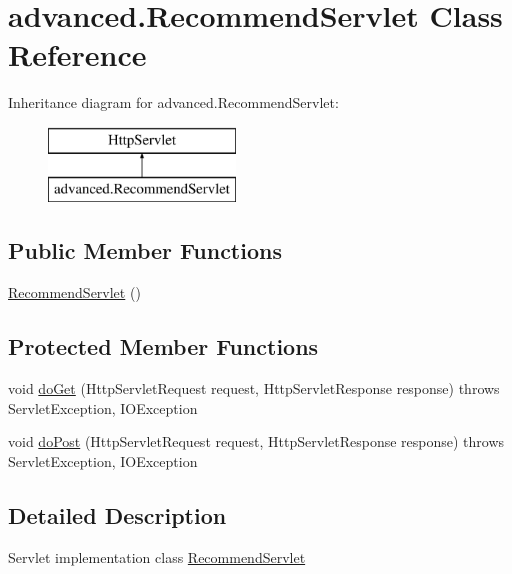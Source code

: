 \hypertarget{classadvanced_1_1_recommend_servlet}{}\section{advanced.\+Recommend\+Servlet Class Reference}
\label{classadvanced_1_1_recommend_servlet}
Inheritance diagram for advanced.\+Recommend\+Servlet\+:\begin{figure}[H]
\begin{center}
\leavevmode
\includegraphics[height=2.000000cm]{classadvanced_1_1_recommend_servlet}
\end{center}
\end{figure}
\subsection*{Public Member Functions}
\begin{DoxyCompactItemize}
\item 
\hyperlink{classadvanced_1_1_recommend_servlet_a0b65a3f29a28d30346b9478aab2fccb6}{Recommend\+Servlet} ()
\end{DoxyCompactItemize}
\subsection*{Protected Member Functions}
\begin{DoxyCompactItemize}
\item 
void \hyperlink{classadvanced_1_1_recommend_servlet_a053694ba555f8bad9dbb25f3f93326fc}{do\+Get} (Http\+Servlet\+Request request, Http\+Servlet\+Response response)  throws Servlet\+Exception, I\+O\+Exception 
\item 
void \hyperlink{classadvanced_1_1_recommend_servlet_af15682cbfbf5f21594538f20d8a8f450}{do\+Post} (Http\+Servlet\+Request request, Http\+Servlet\+Response response)  throws Servlet\+Exception, I\+O\+Exception 
\end{DoxyCompactItemize}


\subsection{Detailed Description}
Servlet implementation class \hyperlink{classadvanced_1_1_recommend_servlet}{Recommend\+Servlet} 

